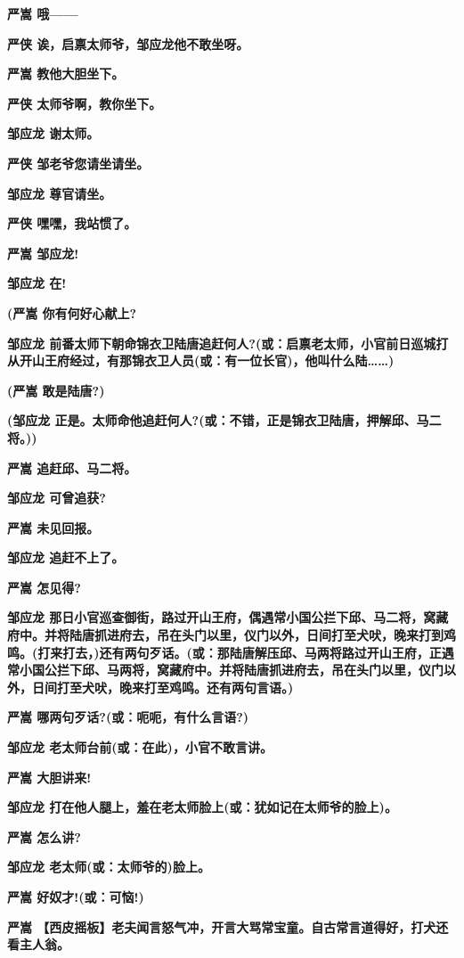 \textbf{严嵩 哦------}

\textbf{严侠 诶，启禀太师爷，邹应龙他不敢坐呀。}

\textbf{严嵩 教他大胆坐下。}

\textbf{严侠 太师爷啊，教你坐下。}

\textbf{邹应龙 谢太师。}

\textbf{严侠 邹老爷您请坐请坐。}

\textbf{邹应龙 尊官请坐。}

\textbf{严侠 嘿嘿，我站惯了。}

\textbf{严嵩 邹应龙!}

\textbf{邹应龙 在!}

\textbf{(严嵩 你有何好心献上?}

\textbf{邹应龙
前番太师下朝命锦衣卫陆唐追赶何人?(或：启禀老太师，小官前日巡城打从开山王府经过，有那锦衣卫人员(或：有一位长官)，他叫什么陆\ldots{}\ldots{})}

\textbf{(严嵩 敢是陆唐?)}

\textbf{(邹应龙
正是。太师命他追赶何人?(或：不错，正是锦衣卫陆唐，押解邱、马二将。))}

\textbf{严嵩 追赶邱、马二将。}

\textbf{邹应龙 可曾追获?}

\textbf{严嵩 未见回报。}

\textbf{邹应龙 追赶不上了。}

\textbf{严嵩 怎见得?}

\textbf{邹应龙
那日小官巡查御街，路过开山王府，偶遇常小国公拦下邱、马二将，窝藏府中。并将陆唐抓进府去，吊在头门以里，仪门以外，日间打至犬吠，晚来打到鸡鸣。(打来打去，)还有两句歹话。(或：那陆唐解压邱、马两将路过开山王府，正遇常小国公拦下邱、马两将，窝藏府中。并将陆唐抓进府去，吊在头门以里，仪门以外，日间打至犬吠，晚来打至鸡鸣。还有两句言语。)}

\textbf{严嵩 哪两句歹话?(或：呃呃，有什么言语?)}

\textbf{邹应龙 老太师台前(或：在此)，小官不敢言讲。}

\textbf{严嵩 大胆讲来!}

\textbf{邹应龙 打在他人腿上，羞在老太师脸上(或：犹如记在太师爷的脸上)。}

\textbf{严嵩 怎么讲?}

\textbf{邹应龙 老太师(或：太师爷的)脸上。}

\textbf{严嵩 好奴才!(或：可恼!)}

\textbf{严嵩
【西皮摇板】老夫闻言怒气冲，开言大骂常宝童。自古常言道得好，打犬还看主人翁。}

